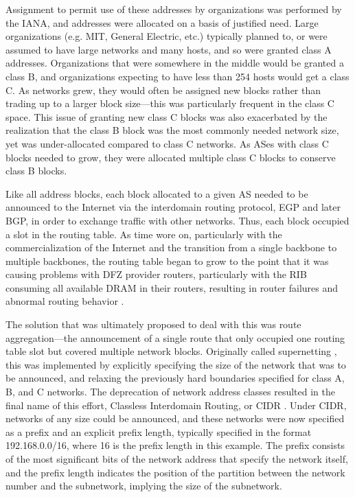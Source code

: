 Assignment to permit use of these addresses by organizations was performed by
the IANA, and addresses were allocated on a basis of justified need. Large
organizations (e.g. MIT, General Electric, etc.) typically planned to, or were
assumed to have large networks and many hosts, and so were granted class A
addresses.  Organizations that were somewhere in the middle would be granted a
class B, and organizations expecting to have less than 254 hosts would get a
class C. As networks grew, they would often be assigned new blocks rather than
trading up to a larger block size---this was particularly frequent in the class
C space.  This issue of granting new class C blocks was also exacerbated by the
realization that the class B block was the most commonly needed network size,
yet was under-allocated compared to class C networks. As ASes with class C
blocks needed to grow, they were allocated multiple class C blocks to conserve
class B blocks.

Like all address blocks, each block allocated to a given AS needed to be
announced to the Internet via the interdomain routing protocol, EGP and later
BGP, in order to exchange traffic with other networks. Thus, each block
occupied a slot in the routing table. As time wore on, particularly with the
commercialization of the Internet and the transition from a single backbone to
multiple backbones, the routing table began to grow to the point that it was
causing problems with DFZ provider routers, particularly with the RIB consuming
all available DRAM in their routers, resulting in router failures and abnormal
routing behavior \cite{Li:2011vn}.

%

The solution that was ultimately proposed to deal with this was route
aggregation---the announcement of a single route that only occupied one routing
table slot but covered multiple network blocks. Originally called supernetting
\cite{rfc1338}, this was implemented by explicitly specifying the size of the
network that was to be announced, and relaxing the previously hard boundaries
specified for class A, B, and C networks. The deprecation of network address
classes resulted in the final name of this effort, Classless Interdomain
Routing, or CIDR \cite{rfc1519}. Under CIDR, networks of any size could be
announced, and these networks were now specified as a prefix and an explicit
prefix length, typically specified in the format 192.168.0.0/16, where 16 is
the prefix length in this example. The prefix consists of the  most significant
bits of the network address that specify the network itself, and the prefix
length indicates the position of the partition between the network number and
the subnetwork, implying the size of the subnetwork.

